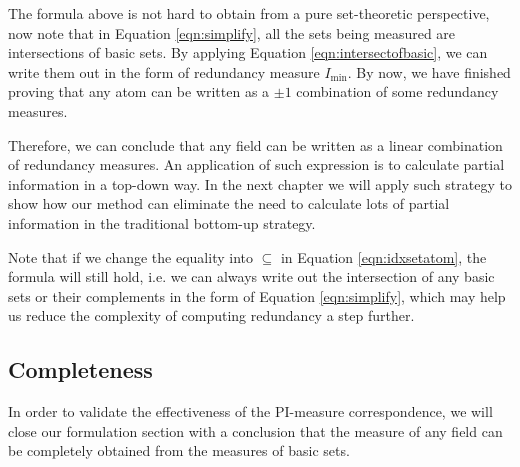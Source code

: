 The formula above is not hard to obtain from a pure set-theoretic perspective, now note that in Equation \ref{eqn:simplify}, all the sets being measured are intersections of basic sets. By applying Equation \ref{eqn:intersectofbasic}, we can write them out in the form of redundancy measure $I_{\min}$. By now, we have finished proving that any atom can be written as a $\pm 1$ combination of some redundancy measures.

Therefore, we can conclude that any field can be written as
a linear combination of redundancy measures. An application of such expression is to calculate partial information in a top-down way. In the next chapter we will apply such strategy to show how our method can eliminate the need to calculate lots of partial information in the traditional bottom-up strategy.

Note that if we change the equality into $\subseteq$ in Equation \ref{eqn:idxsetatom}, the formula will still hold, i.e. we can always write out the intersection of any basic sets or their complements in the form of Equation \ref{eqn:simplify}, which may help us reduce the complexity of computing redundancy a step further.

\subsection{Completeness}
In order to validate the effectiveness of the PI-measure correspondence, we will close our formulation section with a conclusion that the measure of any field can be completely obtained from the measures of basic sets.


